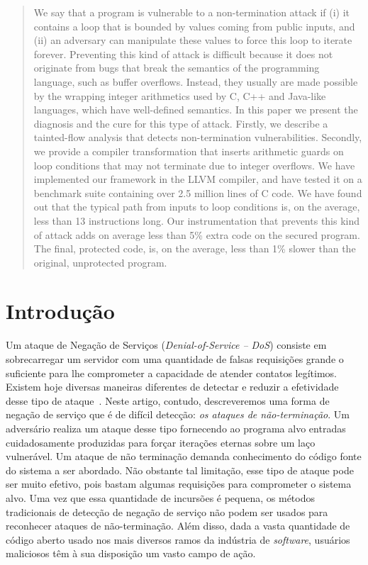 \documentclass{llncs}
\begin{document}
\begin{abstract}
We say that a program is vulnerable to a non-termination attack if (i) it
contains a loop that is bounded by values coming from public inputs, and (ii)
an adversary can manipulate these values to force this loop to iterate forever.
Preventing this kind of attack is difficult because it does not originate
from bugs that break the semantics of the programming
language, such as buffer overflows.
Instead, they usually are made possible by the wrapping integer arithmetics
used by C, C++ and Java-like languages, which have well-defined semantics.
In this paper we present the diagnosis and the cure for this type of attack.
Firstly, we describe a tainted-flow analysis that detects non-termination
vulnerabilities.
Secondly, we provide a compiler transformation that inserts arithmetic guards on
loop conditions that may not terminate due to integer overflows.
We have implemented our framework in the LLVM compiler, and have tested it on
a benchmark suite containing over 2.5 million lines of C code.
We have found out that the typical path from inputs to loop conditions is,
on the average, less than 13 instructions long.
Our instrumentation that prevents this kind of attack adds on average less than
5\% extra code on the secured program.
The final, protected code, is, on the average, less than 1\% slower than the
original, unprotected program.
\end{abstract}

\section{Introdução}
\label{sec:int}

Um ataque de Negação de Serviços ({\em Denial-of-Service -- DoS}) consiste
em sobrecarregar um servidor com uma quantidade de falsas requisições grande o
suficiente para lhe comprometer a capacidade de atender contatos
legítimos.
Existem hoje diversas maneiras diferentes de detectar e reduzir a efetividade
desse tipo de ataque~\cite{Moore06}.
Neste artigo, contudo, descreveremos uma forma de negação de serviço que é de
difícil detecção: {\em os ataques de não-terminação}.
Um adversário realiza um ataque desse tipo fornecendo ao programa alvo entradas
cuidadosamente produzidas para forçar iterações eternas sobre um laço
vulnerável.
Um ataque de não terminação demanda conhecimento do código fonte do sistema
a ser abordado.
Não obstante tal limitação, esse tipo de ataque pode ser muito efetivo,
pois bastam algumas requisições para comprometer o sistema alvo.
Uma vez que essa quantidade de incursões é pequena, os métodos tradicionais
de detecção de negação de serviço não podem ser usados para reconhecer ataques
de não-terminação.
Além disso, dada a vasta quantidade de código aberto usado nos mais diversos
ramos da indústria de {\em software}, usuários maliciosos têm à sua
disposição um vasto campo de ação.
\end{document}
